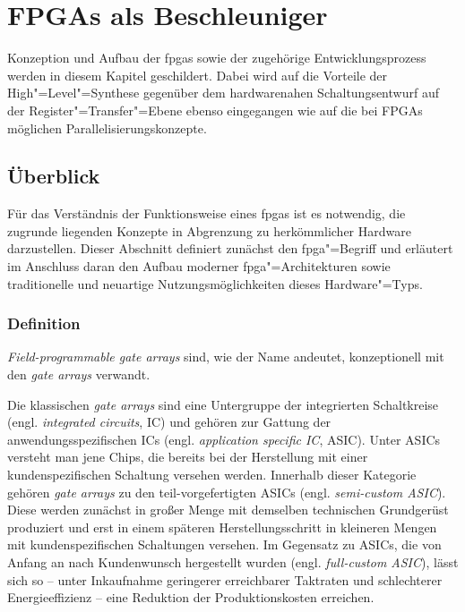\chapter{FPGAs als Beschleuniger}\label{fpga}

Konzeption und Aufbau der \gls{fpga}s sowie der zugehörige Entwicklungsprozess
werden in diesem Kapitel geschildert. Dabei wird auf die Vorteile der
High"=Level"=Synthese gegenüber dem hardwarenahen Schaltungsentwurf auf der
Register"=Transfer"=Ebene ebenso eingegangen wie auf die bei FPGAs möglichen
Parallelisierungskonzepte.

\section{Überblick}\label{fpga:ueberblick}

Für das Verständnis der Funktionsweise eines \gls{fpga}s ist es notwendig, die
zugrunde liegenden Konzepte in Abgrenzung zu herkömmlicher Hardware
darzustellen. Dieser Abschnitt definiert zunächst den \gls{fpga}"=Begriff und
erläutert im Anschluss daran den Aufbau moderner \gls{fpga}"=Architekturen sowie
traditionelle und neuartige Nutzungsmöglichkeiten dieses Hardware"=Typs.

\subsection{Definition}\label{fpga:ueberblick:definition}

\textit{Field-programmable gate arrays} sind, wie der Name andeutet,
konzeptionell mit den \textit{gate arrays} verwandt.

Die klassischen \textit{gate arrays} sind eine Untergruppe der integrierten
Schaltkreise (engl. \textit{integrated circuits}, IC) und gehören zur Gattung
der anwendungsspezifischen ICs (engl. \textit{application specific IC}, ASIC).
Unter ASICs versteht man jene Chips, die bereits bei der Herstellung mit einer
kundenspezifischen Schaltung versehen werden. Innerhalb dieser Kategorie gehören
\textit{gate arrays} zu den teil-vorgefertigten ASICs (engl.
\textit{semi-custom ASIC}). Diese werden zunächst in großer Menge mit demselben
technischen Grundgerüst produziert und erst in einem späteren
Herstellungsschritt in kleineren Mengen mit kundenspezifischen Schaltungen
versehen. Im Gegensatz zu ASICs, die von Anfang an nach Kundenwunsch hergestellt
wurden (engl. \textit{full-custom ASIC}), lässt sich so -- unter Inkaufnahme
geringerer erreichbarer Taktraten und schlechterer Energieeffizienz -- eine
Reduktion der Produktionskosten erreichen. \cite[vgl.][123]{kesel2013}

